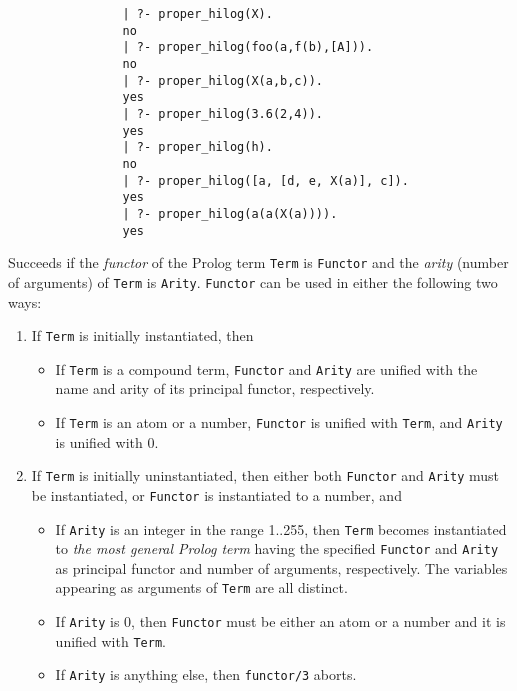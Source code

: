 \begin{description}
    {\footnotesize
     \begin{verbatim}
                | ?- proper_hilog(X).
                no
                | ?- proper_hilog(foo(a,f(b),[A])).
                no
                | ?- proper_hilog(X(a,b,c)).
                yes
                | ?- proper_hilog(3.6(2,4)).
                yes
                | ?- proper_hilog(h).
                no
                | ?- proper_hilog([a, [d, e, X(a)], c]).
                yes
                | ?- proper_hilog(a(a(X(a)))).
                yes
     \end{verbatim}}

    Succeeds if the {\em functor} of the Prolog term {\tt Term} is 
    {\tt Functor} and the {\em arity} (number of arguments) of {\tt Term} is
    {\tt Arity}\@.  {\tt Functor} can be used in either the following two 
    ways:
    \begin{enumerate}
    \item If {\tt Term} is initially instantiated, then
          \begin{itemize}
          \item If {\tt Term} is a compound term, {\tt Functor} and 
                {\tt Arity} are unified with the name and arity of 
                its principal functor, respectively. 
          \item If {\tt Term} is an atom or a number, {\tt Functor} is 
                unified with {\tt Term}, and {\tt Arity} is unified with 0.
          \end{itemize}
    \item If {\tt Term} is initially uninstantiated, then either both 
          {\tt Functor} and {\tt Arity} must be instantiated, or {\tt Functor}
          is instantiated to a number, and
          \begin{itemize}
          \item If {\tt Arity} is an integer in the range 1..255, then
                {\tt Term} becomes instantiated to {\em the most general 
                Prolog term} having the specified {\tt Functor} and 
                {\tt Arity} as principal functor and number of arguments,
                respectively. The variables appearing as arguments of 
                {\tt Term} are all distinct.
          \item If {\tt Arity} is 0, then {\tt Functor} must be either an 
                atom or a number and it is unified with {\tt Term}. 
          \item If {\tt Arity} is anything else, then {\tt functor/3} aborts.
          \end{itemize}
    \end{enumerate}


\end{description}
